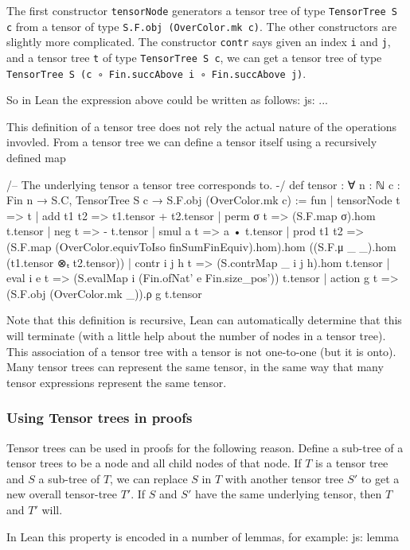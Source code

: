 \documentclass[a4paper, 11pt]{article}
\newcommand{\js}[1]{ {\color{magenta} js:  #1}}
\begin{document}
The first constructor \lstinline|tensorNode| generators a tensor tree of type  
\lstinline|TensorTree S c| from a tensor of type \lstinline|S.F.obj (OverColor.mk c)|.
The other constructors are slightly more complicated. The constructor \lstinline|contr| says 
given an index \lstinline|i| and \lstinline|j|, and a tensor tree \lstinline|t| of type 
\lstinline|TensorTree S c|, we can get a tensor tree of type \lstinline|TensorTree S (c ∘ Fin.succAbove i ∘ Fin.succAbove j)|. 

So in Lean the expression above could be written as follows:
\js{...}


This definition of a tensor tree does not rely the actual nature of the operations invovled. 
From a tensor tree we can define a tensor itself using a recursively defined map 
\begin{code}
/-- The underlying tensor a tensor tree corresponds to. -/
def tensor : ∀ {n : ℕ} {c : Fin n → S.C}, TensorTree S c → S.F.obj (OverColor.mk c) := fun
  | tensorNode t => t
  | add t1 t2 => t1.tensor + t2.tensor
  | perm σ t => (S.F.map σ).hom t.tensor
  | neg t => - t.tensor
  | smul a t => a • t.tensor
  | prod t1 t2 => (S.F.map (OverColor.equivToIso finSumFinEquiv).hom).hom
    ((S.F.μ _ _).hom (t1.tensor ⊗ₜ t2.tensor))
  | contr i j h t => (S.contrMap _ i j h).hom t.tensor
  | eval i e t => (S.evalMap i (Fin.ofNat' e Fin.size_pos')) t.tensor
  | action g t => (S.F.obj (OverColor.mk _)).ρ g t.tensor
\end{code}
Note that this definition is recursive, Lean can automatically determine that this will terminate 
(with a little help about the number of nodes in a tensor tree). 
This association of a tensor tree with a tensor is not one-to-one (but it is onto).
Many tensor trees can represent the same tensor, in the same way that many 
tensor expressions represent the same tensor. 


\subsubsection{Using Tensor trees in proofs} \label{sec:usingTensorTrees}
Tensor trees can be used in proofs for the following reason. Define a sub-tree of a tensor trees 
to be a node and all child nodes of that node. 
If $T$ is a tensor tree and $S$ a sub-tree of $T$, we can replace $S$ in $T$ 
with another tensor tree $S'$
to get a new overall tensor-tree $T'$. If $S$ and $S'$ have the same underlying tensor, 
then $T$ and $T'$ will. 

In Lean this property is encoded in a number of lemmas, for example: 
\js{lemma}
\end{document}
